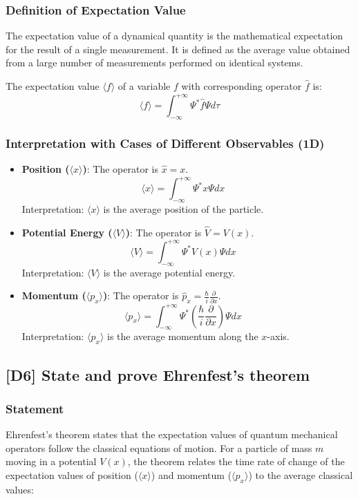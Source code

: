 \documentclass[12pt]{article}
\begin{document}
\subsubsection*{Definition of Expectation Value}
The expectation value of a dynamical quantity is the mathematical expectation for the result of a single measurement. It is defined as the average value obtained from a large number of measurements performed on identical systems.

The expectation value $\langle f \rangle$ of a variable $f$ with corresponding operator $\hat{f}$ is:
$$
\langle f \rangle = \int_{-\infty}^{+\infty} \Psi^* \hat{f} \Psi d\tau
$$

\subsubsection*{Interpretation with Cases of Different Observables (1D)}
\begin{itemize}
    \item \textbf{Position ($\langle x \rangle$)}: The operator is $\hat{x} = x$.
    $$
    \langle x \rangle = \int_{-\infty}^{+\infty} \Psi^* x \Psi dx \quad \text{}
    $$
    Interpretation: $\langle x \rangle$ is the average position of the particle.
    \item \textbf{Potential Energy ($\langle V \rangle$)}: The operator is $\hat{V} = V(x)$.
    $$
    \langle V \rangle = \int_{-\infty}^{+\infty} \Psi^* V(x) \Psi dx \quad \text{}
    $$
    Interpretation: $\langle V \rangle$ is the average potential energy.
    \item \textbf{Momentum ($\langle p_x \rangle$)}: The operator is $\hat{p}_x = \frac{\hbar}{i} \frac{\partial}{\partial x}$.
    $$
    \langle p_x \rangle = \int_{-\infty}^{+\infty} \Psi^* \left(\frac{\hbar}{i} \frac{\partial}{\partial x}\right) \Psi dx \quad \text{}
    $$
    Interpretation: $\langle p_x \rangle$ is the average momentum along the $x$-axis.
\end{itemize}

\subsection{[D6] State and prove Ehrenfest’s theorem}

\subsubsection*{Statement}
Ehrenfest’s theorem states that the expectation values of quantum mechanical operators follow the classical equations of motion. For a particle of mass $m$ moving in a potential $V(x)$, the theorem relates the time rate of change of the expectation values of position ($\langle x \rangle$) and momentum ($\langle p_x \rangle$) to the average classical values:
\end{document}
